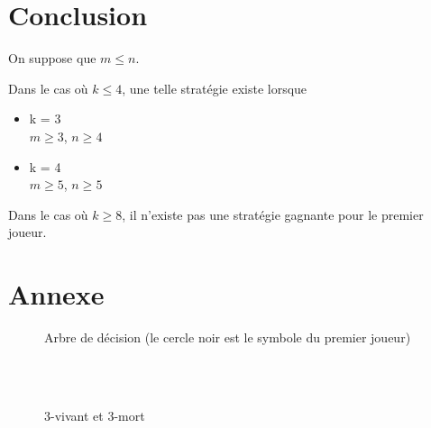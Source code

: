 \documentclass[12pt, a4paper]{article}
\begin{document}
\section{Conclusion}
On suppose que $m \le n$.\par
Dans le cas où $k \le 4$, une telle stratégie existe lorsque
\begin{itemize}
    \item k = 3\\
        $m \ge 3$, $n \ge 4$
    \item k = 4\\
        $m \ge 5$, $n \ge 5$
\end{itemize}
\par
Dans le cas où $k \ge 8$, il n'existe pas une stratégie gagnante pour le premier joueur.

\newpage

\section{Annexe}

\begin{figure}[htp]
    \centering
    \cleargoban

    \caption{Arbre de décision (le cercle noir est le symbole du premier joueur)} \label{fig:arbre}
\end{figure}

\cleargoban

\begin{figure}[htp]
    \centering
    \\
    \ \\
    \caption{3-vivant et 3-mort}
    \label{fig:vivmort}
\end{figure}
\end{document}
